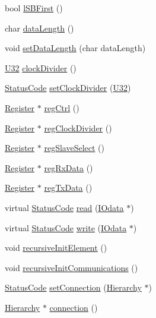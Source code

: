 \begin{DoxyCompactItemize}
\item 
bool \hyperlink{classUsbSpiBus_af6af49c1ac52cc0586570c1f43d0bc25}{lSBFirst} ()
\item 
char \hyperlink{classUsbSpiBus_ae7d38b275b5267f795b2d9f1d561d688}{dataLength} ()
\item 
void \hyperlink{classUsbSpiBus_abb9644f0110078dc08c84c907d11272e}{setDataLength} (char dataLength)
\item 
\hyperlink{classUsbSpiBus_a9b24e28662a35ca57f5ed32c41c5f3ff}{U32} \hyperlink{classUsbSpiBus_aa7a56b8aedb646ba46408cb5016dde1c}{clockDivider} ()
\item 
\hyperlink{classStatusCode}{StatusCode} \hyperlink{classUsbSpiBus_a8cd3c808e7b72d8bc0f1d85a774e8c99}{setClockDivider} (\hyperlink{classUsbSpiBus_a9b24e28662a35ca57f5ed32c41c5f3ff}{U32})
\item 
\hyperlink{classRegister}{Register} $\ast$ \hyperlink{classUsbSpiBus_a22900de7a32af6916f74584f2172424a}{regCtrl} ()
\item 
\hyperlink{classRegister}{Register} $\ast$ \hyperlink{classUsbSpiBus_a338edc7bdac1abd1998890bb1aa0509a}{regClockDivider} ()
\item 
\hyperlink{classRegister}{Register} $\ast$ \hyperlink{classUsbSpiBus_a9bc70ad9842d8aa8f89b24599bfd6238}{regSlaveSelect} ()
\item 
\hyperlink{classRegister}{Register} $\ast$ \hyperlink{classUsbSpiBus_adb0c94f37c7e6008ed4540efa94559b3}{regRxData} ()
\item 
\hyperlink{classRegister}{Register} $\ast$ \hyperlink{classUsbSpiBus_ab8044b2af7209f9eb37c0a96e3e28637}{regTxData} ()
\item 
virtual \hyperlink{classStatusCode}{StatusCode} \hyperlink{classUsbSpiBus_a6c08e2e9a50e4c540c1eda6d7d2967a5}{read} (\hyperlink{classIOdata}{IOdata} $\ast$)
\item 
virtual \hyperlink{classStatusCode}{StatusCode} \hyperlink{classUsbSpiBus_a3ac9d6f5053ddb8b2f8336f2aa88934e}{write} (\hyperlink{classIOdata}{IOdata} $\ast$)
\item 
void \hyperlink{classElement_a3c0abcb36f8906688bb7e32608df7086}{recursiveInitElement} ()
\item 
void \hyperlink{classElement_a82119ed37dff76508a2746a853ec35ba}{recursiveInitCommunications} ()
\item 
\hyperlink{classStatusCode}{StatusCode} \hyperlink{classElement_ab476b4b1df5954141ceb14f072433b89}{setConnection} (\hyperlink{classHierarchy}{Hierarchy} $\ast$)
\item 
\hyperlink{classHierarchy}{Hierarchy} $\ast$ \hyperlink{classElement_af57444353c1ddf9fa0109801e97debf7}{connection} ()

\end{DoxyCompactItemize}
